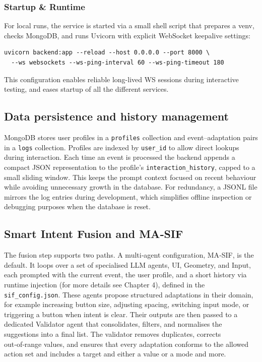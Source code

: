 \documentclass[openany]{book}
\begin{document}
\subsubsection*{Startup \& Runtime}
For local runs, the service is started via a small shell script that prepares a venv, checks MongoDB, and runs Uvicorn with explicit WebSocket keepalive settings:
\begin{lstlisting}[basicstyle=\ttfamily\small,caption={Backend startup (excerpt)}]
uvicorn backend:app --reload --host 0.0.0.0 --port 8000 \
  --ws websockets --ws-ping-interval 60 --ws-ping-timeout 180
\end{lstlisting}
This configuration enables reliable long-lived WS sessions during interactive testing, and eases startup of all the different services.

\subsection{Data persistence and history management}
MongoDB stores user profiles in a \texttt{profiles} collection and event–adaptation pairs in a \texttt{logs} collection. Profiles are indexed by \texttt{user\_id} to allow direct lookups during interaction. Each time an event is processed the backend appends a compact JSON representation to the profile’s \texttt{interaction\_history}, capped to a small sliding window. This keeps the prompt context focused on recent behaviour while avoiding unnecessary growth in the database. For redundancy, a JSONL file mirrors the log entries during development, which simplifies offline inspection or debugging purposes when the database is reset.

\subsection{Smart Intent Fusion and MA‑SIF}
The fusion step supports two paths. A multi‑agent configuration, MA‑SIF, is the default. It loops over a set of specialised LLM agents, UI, Geometry, and Input, each prompted with the current event, the user profile, and a short history via runtime injection (for more details see Chapter 4), defined in the \texttt{sif\_config.json}. These agents propose structured adaptations in their domain, for example increasing button size, adjusting spacing, switching input mode, or triggering a button when intent is clear. Their outputs are then passed to a dedicated Validator agent that consolidates, filters, and normalises the suggestions into a final list. The validator removes duplicates, corrects out‑of‑range values, and ensures that every adaptation conforms to the allowed action set and includes a target and either a value or a mode and more.
\end{document}
